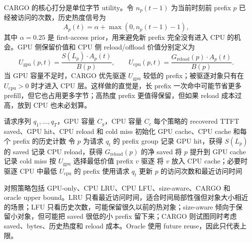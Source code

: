 \documentclass[UTF8,a4paper,10pt]{ctexart}
\begin{document}
CARGO 的核心打分是单位字节 utility。令 $n_p(t-1)$ 为当前时刻前 prefix $p$ 已经被访问的次数，历史热度信号为
\begin{equation}
A_p(t)=\alpha+\max(0,n_p(t-1)-1),
\label{eq:history-signal}
\end{equation}
其中 $\alpha=0.25$ 是 first-access prior，用来避免新 prefix 完全没有进入 CPU 的机会。GPU 侧保留价值和 CPU 侧 reload/offload 价值分别定义为
\begin{equation}
U_{\mathrm{gpu}}(p,t)=\frac{S(L_p)\cdot A_p(t)}{B(p)},
\qquad
U_{\mathrm{cpu}}(p,t)=\frac{G_{\mathrm{reload}}(p)\cdot A_p(t)}{B(p)}.
\label{eq:cargo-score}
\end{equation}
当 GPU 容量不足时，CARGO 优先驱逐 $U_{\mathrm{gpu}}$ 较低的 prefix；被驱逐对象只有在 $U_{\mathrm{cpu}}>0$ 时才进入 CPU 层。这样做的直觉是，长 prefix 一次命中可能节省更多 prefill，但它也占用更多字节；高热度 prefix 更值得保留，但如果 reload 成本过高，放到 CPU 也未必划算。

\begin{algorithm}[H]
\caption{Online CARGO replay 决策流程}
\label{alg:cargo}
\begin{algorithmic}[1]
\Require 请求序列 $q_1,\ldots,q_T$，GPU 容量 $C_g$，CPU 容量 $C_c$
\Ensure 每个策略的 recovered TTFT saved、GPU hit、CPU reload 和 cold miss
\State 初始化 GPU cache、CPU cache 和每个 prefix 的历史计数
    \State 令 $p$ 为请求 $q_t$ 的 prefix group
        \State 记录 GPU hit，获得 $S(L_p)$ 的 saved
        \State 记录 CPU reload，获得 $G_{\mathrm{reload}}(p)$ 的净 saved
        \State 将 $p$ 提升到 GPU cache
    \Else
        \State 记录 cold miss
    \EndIf
        \State 按 $U_{\mathrm{gpu}}$ 选择最低价值 prefix $v$ 驱逐
            \State 将 $v$ 放入 CPU cache；必要时驱逐 CPU 中最低 $U_{\mathrm{cpu}}$ 的 prefix
        \EndIf
    \EndWhile
    \State 使用请求 $q_t$ 更新 $p$ 的访问次数和最近访问时间
\EndFor
\end{algorithmic}
\end{algorithm}

对照策略包括 GPU-only、CPU LRU、CPU LFU、size-aware、CARGO 和 oracle upper bound。LRU 只看最近访问时间，适合时间局部性强但对象大小相近的场景；LFU 只看历史次数，可能保留很久以前的热对象；size-aware 倾向于保留小对象，但可能把 saved 很低的小 prefix 留下来；CARGO 则试图同时考虑 saved、bytes、历史热度和 reload 成本。Oracle 使用 future reuse，因此只代表上限。
\end{document}
